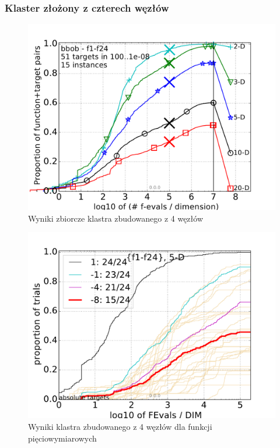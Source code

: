 \documentclass[12pt, twoside, openany, abstract=on]{report}
\theoremstyle{definition}
\begin{document}
\subsubsection{Klaster złożony z czterech węzłów}

\begin{figure}[H]
    \includegraphics[scale=1]{charts/4nodes.pdf} 
 \caption{Wyniki zbiorcze klastra zbudowanego z 4 węzłów}
\end{figure}

\begin{figure}[H]
    \includegraphics[scale=1]{charts/4nodes_5D.pdf} \par
 \caption{Wyniki klastra zbudowanego z 4 węzłów dla funkcji pięciowymiarowych}
\end{figure}
\end{document}
